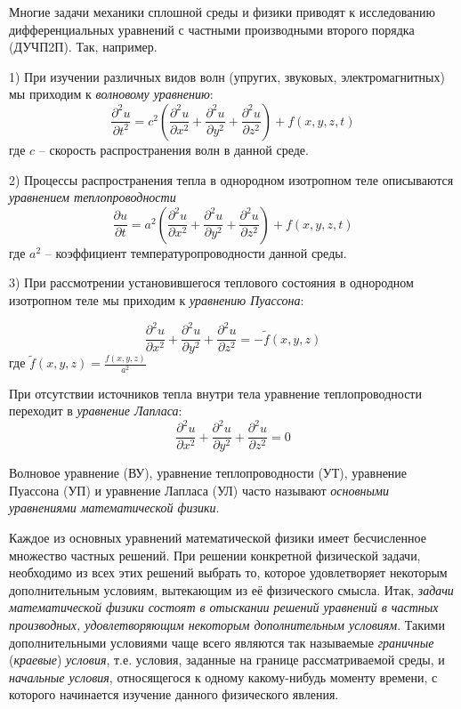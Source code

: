 Многие задачи механики сплошной среды и физики приводят к исследованию дифференциальных уравнений с частными производными второго порядка (ДУЧП2П). Так, например.

\bigskip

1) При изучении различных видов волн (упругих, звуковых, электромагнитных) мы приходим к \textit{волновому уравнению}:
\[
	\frac{\partial ^{2} u}{\partial t^{2} } =c^{2} \left(\frac{\partial ^{2} u}{\partial x^{2} } + \frac{\partial ^{2} u}{\partial y^{2} } + \frac{\partial ^{2} u}{\partial z^{2} } \right) + f(x,y,z,t)
\]
где $c$ -- скорость распространения волн в данной среде.

\bigskip

2) Процессы распространения тепла в однородном изотропном теле описываются \textit{уравнением теплопроводности}
\[
	\frac{\partial u}{\partial t} =a^{2} \left(\frac{\partial ^{2} u}{\partial x^{2} } +\frac{\partial ^{2} u}{\partial y^{2} } +\frac{\partial ^{2} u}{\partial z^{2} } \right)+f(x,y,z,t)\]
где $a^{2} $ -- коэффициент температуропроводности данной среды.

\bigskip

3) При рассмотрении установившегося теплового состояния в однородном изотропном теле мы приходим к \textit{уравнению Пуассона}:

\[\frac{\partial ^{2} u}{\partial x^{2} } +\frac{\partial ^{2} u}{\partial y^{2} } +\frac{\partial ^{2} u}{\partial z^{2} } =-\tilde{f}(x,y,z)\]
где   $\tilde{f}(x,y,z)=\frac{f(x,y,z)}{a^{2} } $

\bigskip

\noindent При отсутствии источников тепла внутри тела уравнение теплопроводности переходит в \textit{уравнение Лапласа}:
\[\frac{\partial ^{2} u}{\partial x^{2} } +\frac{\partial ^{2} u}{\partial y^{2} } +\frac{\partial ^{2} u}{\partial z^{2} } =0\]

\bigskip

Волновое уравнение (ВУ), уравнение теплопроводности (УТ), уравнение Пуассона (УП) и уравнение Лапласа (УЛ) часто называют \textit{основными уравнениями математической физики}.

\bigskip

Каждое из основных уравнений математической физики имеет бесчисленное множество частных решений. При решении конкретной физической задачи, необходимо из всех этих решений выбрать то, которое удовлетворяет некоторым дополнительным условиям, вытекающим из её физического смысла. Итак, \textit{задачи математической физики состоят в отыскании решений уравнений в частных производных, удовлетворяющим некоторым дополнительным условиям}. Такими дополнительными условиями чаще всего являются так называемые \textit{граничные }(\textit{краевые})\textit{ условия}, т.е. условия, заданные на границе рассматриваемой среды, и \textit{начальные условия}, относящегося к одному какому-нибудь моменту времени, с которого начинается изучение данного физического явления.

